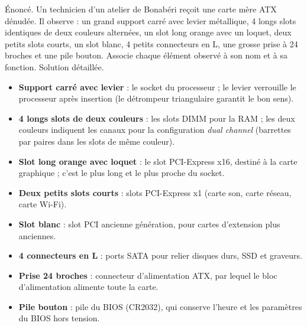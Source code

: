 \documentclass[11pt]{article}
\newcommand{\cle}[1]{{\popxbold\color{popdark}#1}}
\begin{document}
\begin{exoresolu}
Énoncé. Un technicien d'un atelier de Bonabéri reçoit une carte mère ATX dénudée. Il observe : un grand support carré avec levier métallique, 4 longs slots identiques de deux couleurs alternées, un slot long orange avec un loquet, deux petits slots courts, un slot blanc, 4 petits connecteurs en L, une grosse prise à 24 broches et une pile bouton. Associe chaque élément observé à son nom et à sa fonction.
\tcblower
Solution détaillée.
\begin{itemize}
  \item \textbf{Support carré avec levier} : le \cle{socket} du processeur ; le levier verrouille le processeur après insertion (le détrompeur triangulaire garantit le bon sens).
  \item \textbf{4 longs slots de deux couleurs} : les slots \cle{DIMM} pour la RAM ; les deux couleurs indiquent les canaux pour la configuration \emph{dual channel} (barrettes par paires dans les slots de même couleur).
  \item \textbf{Slot long orange avec loquet} : le slot \cle{PCI-Express x16}, destiné à la carte graphique ; c'est le plus long et le plus proche du socket.
  \item \textbf{Deux petits slots courts} : slots \cle{PCI-Express x1} (carte son, carte réseau, carte Wi-Fi).
  \item \textbf{Slot blanc} : slot \cle{PCI} ancienne génération, pour cartes d'extension plus anciennes.
  \item \textbf{4 connecteurs en L} : ports \cle{SATA} pour relier disques durs, SSD et graveurs.
  \item \textbf{Prise 24 broches} : connecteur d'alimentation \cle{ATX}, par lequel le bloc d'alimentation alimente toute la carte.
  \item \textbf{Pile bouton} : pile du \cle{BIOS} (CR2032), qui conserve l'heure et les paramètres du BIOS hors tension.
\end{itemize}
\end{exoresolu}
\end{document}
